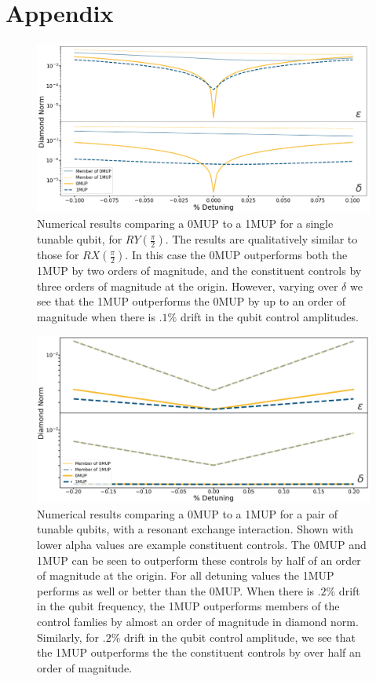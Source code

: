 \documentclass[aps,nofootinbib,pra,notitlepage,twocolumn]{revtex4-1}
\begin{document}
\section{Appendix}
\label{sec:appendix}
\begin{figure}[h]
  \centering
  \includegraphics[width=\textwidth]{SQRTY.png}
  \caption{Numerical results comparing a 0MUP to a 1MUP for a single tunable qubit, for $RY(\frac{\pi}{2})$. The results are qualitatively similar to those for $RX(\frac{\pi}{2})$. In this case the 0MUP outperforms both the 1MUP by two orders of magnitude, and the constituent controls by three orders of magnitude at the origin. However, varying over $\delta$ we see that the 1MUP outperforms the 0MUP by up to an order of magnitude when there is $.1\%$ drift in the qubit control amplitudes.}
  \label{fig:YMUP}
\end{figure}

\begin{figure}[h]
  \centering
  \includegraphics[width=\textwidth]{2QRBC.png}
  \caption{Numerical results comparing a 0MUP to a 1MUP for a pair of tunable qubits, with a resonant exchange interaction. Shown with lower alpha values are example constituent controls. The 0MUP and 1MUP can be seen to outperform these controls by half of an order of magnitude at the origin. For all detuning values the 1MUP performs as well or better than the 0MUP. When there is $.2\%$ drift in the qubit frequency, the 1MUP outperforms members of the control famlies by almost an order of magnitude in diamond norm. Similarly, for $.2\%$ drift in the qubit control amplitude, we see that the 1MUP outperforms the the constituent controls by over half an order of magnitude.}
  \label{fig:2MUP}
\end{figure}
\end{document}
